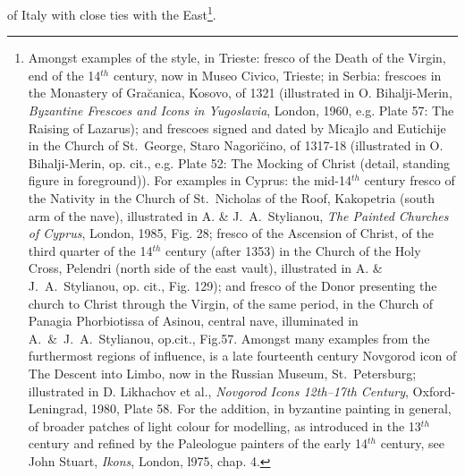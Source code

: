 \documentclass[a4paper,12pt]{article}
\begin{document}
of Italy with close ties with the East\footnote{Amongst examples of
the style, in Trieste: fresco of the Death of the Virgin, end of the
14$^{th}$ century, now in Museo Civico, Trieste; in Serbia: frescoes
in the Monastery of Gra\u{c}anica, Kosovo, of 1321 (illustrated in
O. Bihalji-Merin, \textit{Byzantine Frescoes and Icons in Yugoslavia},
London, 1960, e.g. Plate 57: The Raising of Lazarus); and frescoes
signed and dated by Micajlo and Eutichije in the Church of St.~George,
Staro Nagori\u{c}ino, of 1317-18 (illustrated in O. Bihalji-Merin,
op. cit., e.g. Plate 52: The Mocking of Christ (detail, standing
figure in foreground)). For examples in Cyprus: the mid-14$^{th}$
century fresco of the Nativity in the Church of St.~Nicholas of the
Roof, Kakopetria (south arm of the nave), illustrated in A. \&
J.~A.~Stylianou, \textit{The Painted Churches of Cyprus}, London, 1985,
Fig. 28; fresco of the Ascension of Christ, of the third quarter of
the 14$^{th}$ century (after 1353) in the Church of the Holy Cross,
Pelendri (north side of the east vault), illustrated in A. \&
J.~A.~Stylianou, op. cit., Fig. 129); and fresco of the Donor
presenting the church to Christ through the Virgin, of the same
period, in the Church of Panagia Phorbiotissa of Asinou, central nave,
illuminated in A.~\&~J.~A.~Stylianou, op.cit., Fig.57. Amongst many
examples from the furthermost regions of influence, is a late
fourteenth century Novgorod icon of The Descent into Limbo, now in the
Russian Museum, St.~Petersburg; illustrated in D. Likhachov et al.,
\textit{Novgorod Icons 12th--17th Century}, Oxford-Leningrad, 1980,
Plate 58. For the addition, in byzantine painting in general, of
broader patches of light colour for modelling, as introduced in the
13$^{th}$ century and refined by the Paleologue painters of the early
14$^{th}$ century, see John Stuart, \textit{Ikons}, London, l975,
chap. 4.}.
\end{document}
